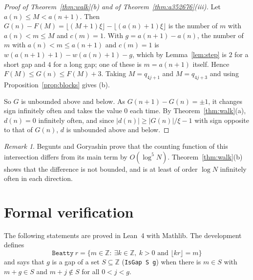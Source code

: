 \documentclass[12pt]{article}
\newcommand{\fl}[1]{\lfloor #1 \rfloor}
\newcommand{\Z}{\mathbb{Z}}
\theoremstyle{plain}
\theoremstyle{remark}
\newtheorem{remark}[theorem]{Remark}
\begin{document}
\begin{proof}[Proof of Theorem~\ref{thm:walk}(b) and of Theorem~\ref{thm:a352676}(iii)]
Let $a(n)\le M<a(n+1)$. Then $G(n)-F(M)=\fl{(M+1)\xi}-\fl{(a(n)+1)\xi}$ is the number of
$m$ with $a(n)<m\le M$ and $c(m)=1$. With $g=a(n+1)-a(n)$, the number of $m$ with
$a(n)<m\le a(n+1)$ and $c(m)=1$ is $w(a(n+1)+1)-w(a(n)+1)-g$, which by
Lemma~\ref{lem:step} is $2$ for a short gap and $4$ for a long gap; one of these is
$m=a(n+1)$ itself. Hence $F(M)\le G(n)\le F(M)+3$. Taking $M=q_{4j+1}$ and
$M=q_{4j+3}$ and using Proposition~\ref{prop:blocks} gives (b).

So $G$ is unbounded above and below. As $G(n+1)-G(n)=\pm1$, it changes sign infinitely often and
takes the value $0$ each time. By Theorem~\ref{thm:walk}(a), $d(n)=0$ infinitely often, and
since $|d(n)|\ge|G(n)|/\xi-1$ with sign opposite to that of $G(n)$, $d$ is unbounded above and
below.
\end{proof}

\begin{remark}
Begunts and Goryashin \cite{bg25} prove that the counting function of this intersection differs
from its main term by $O(\log^5 N)$. Theorem~\ref{thm:walk}(b) shows that the difference is not
bounded, and is at least of order $\log N$ infinitely often in each direction.
\end{remark}

\section{Formal verification}\label{sec:lean}

The following statements are proved in Lean~4 with Mathlib. The development defines
\[
\texttt{Beatty}\ r=\{m\in\Z:\ \exists k\in\Z,\ k>0\text{ and }\fl{kr}=m\}
\]
and says that $g$ is a gap of a set $S\subseteq\Z$ (\texttt{IsGap S g}) when there is $m\in S$
with $m+g\in S$ and $m+j\notin S$ for all $0<j<g$.
\end{document}
